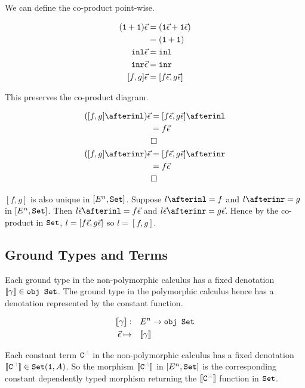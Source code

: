     We can define the co-product point-wise.
    
    \begin{align*}
        (\texttt{1} + \texttt{1})\vec{\epsilon} & = (\texttt{1}\vec{\epsilon} + \texttt{1}\vec{\epsilon})\\
        & = (\texttt{1} + \texttt{1})\\
        \texttt{inl}\vec{\epsilon} &= \texttt{inl}\\
        \texttt{inr}\vec{\epsilon} &= \texttt{inr}\\
        [f, g]\vec{\epsilon} &= [f\vec{\epsilon}, g\vec{\epsilon}]\\
    \end{align*}
    
    This preserves the co-product diagram.
    
    \begin{align*}
        ([f, g]\after\inl)\ev & = [f\ev, g\ev]\after \inl\\
        & = f\ev\\
        & \square\\
        ([f, g]\after\inr)\ev& = [f\ev, g\ev]\after \inr\\
        & = f\ev\\
        & \square\\
    \end{align*}
    
    $[f, g]$ is also unique in $[E^n, \texttt{Set}]$. Suppose $l \after \inl = f$ and $l\after \inr = g$ in $[E^n, \texttt{Set}]$. Then $l\ev \after \inl = f\ev$ and $l\ev \after\inr = g\ev$. Hence by the co-product in $\texttt{Set}$, $l = [f\vec{\epsilon}, g\vec{\epsilon}]$ so $l = [f, g]$.
    
    
    \subsection{Ground Types and Terms}
    Each ground type in the non-polymorphic calculus has a fixed denotation ${\bf [\![}\gamma{\bf ]\!]}\in\texttt{obj }\texttt{Set}$. The ground type in the polymorphic calculus hence has a denotation represented by the constant function.
    
    \begin{align*}
        {\bf [\![}\gamma{\bf ]\!]}:&\quad E^n\rightarrow \texttt{obj }\texttt{Set}\\
        \vec{\epsilon} \mapsto&\quad  {\bf [\![}\gamma{\bf ]\!]}\\
    \end{align*}
    
    Each constant term $\const{A}$ in the non-polymorphic calculus has a fixed denotation $\deno{\const{A}}\in\set(\1, A)$. So the morphism $\deno{\const{A}}$ in $[E^n, \texttt{Set}]$ is the corresponding constant dependently typed morphism returning the $\deno{\const{A}}$ function in $\texttt{Set}$.
    
